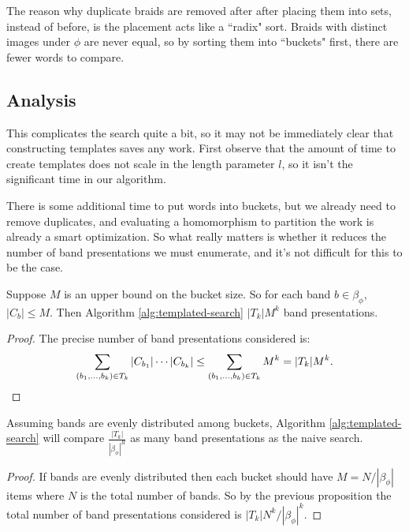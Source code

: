\documentclass[12pt]{thesis}
\begin{document}
The reason why duplicate braids are removed after after placing them
into sets, instead of before, is the placement acts like a ``radix" sort.
Braids with distinct images under $\phi$ are never equal,
so by sorting them into ``buckets" first, there are fewer words to compare.

\subsection{Analysis}

This complicates the search quite a bit,
so it may not be immediately clear that constructing templates saves any work.
First observe that the amount of time to create
templates does not scale in the length parameter $l$,
so it isn't the significant time in our algorithm.

There is some additional time to put words into buckets,
but we already need to remove duplicates, and evaluating 
a homomorphism to partition the work is already 
a smart optimization.
So what really matters is whether it reduces
the number of band presentations we must enumerate,
and it's not difficult for this to be the case.

\begin{proposition}
    Suppose $M$ is an upper bound on the bucket size.
    So for each band $b \in \beta_{\phi}$,
    $|C_{b}| \leq M$.
    Then Algorithm \ref{alg:templated-search} $|T_{k}| M^{k}$ 
    band presentations.
\end{proposition}

\begin{proof}
    The precise number of band presentations considered is:
    \[
        \sum_{(b_{1}, \ldots, b_{k}) \in T_{k}} |C_{b_{1}}| \cdots |C_{b_{k}}|
        \leq  \sum_{(b_{1}, \ldots, b_{k}) \in T_{k}} M^{k}
        = |T_{k}|M^{k}. \qedhere
    \]
\end{proof}

\begin{corollary}
    Assuming bands are evenly distributed among buckets,
    Algorithm \ref{alg:templated-search} will compare
        $\frac{ |T_{k}| }{ |\beta_{\phi}|^{R} }$
    as many band presentations as the naive search.
\end{corollary}

\begin{proof}
    If bands are evenly distributed
    then each bucket should have $M = N/|\beta_{\phi}|$ items
    where $N$ is the total number of bands.
    So by the previous proposition
    the total number of band presentations
    considered is $|T_{k}|N^{k}/|\beta_{\phi}|^{k}$.
\end{proof}
\end{document}
